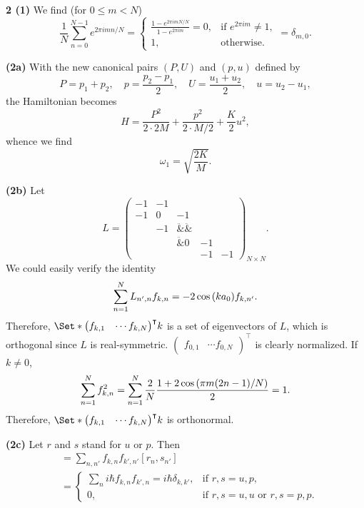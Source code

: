 \documentclass{article}
\makeatletter
\newcommand*{\shifttext}[1]{%
  \settowidth{\@tempdima}{#1}%
  \hspace{-\@tempdima}#1%
}
\newcommand{\plabel}[1]{%
\shifttext{\textbf{#1}\quad}%
}
\newcommand{\prule}{%
\begin{center}%
\hdashrule[0.5ex]{.99\linewidth}{1pt}{1pt 2.5pt}%
\end{center}%
}
\makeatother
\begin{document}
\prule
\plabel{2 (1)}%
We find (for $0\le m < N$)
\[ \frac{1}{N} \sum_{n=0}^{N-1} e^{2\pi i m n / N} = \begin{cases}
    \displaystyle\frac{1 - e^{2\pi i m N/N}}{1 - e^{2\pi i m}} = 0, & \text{if $e^{2\pi i m} \neq 1$}, \\
    1, &\text{otherwise}.
\end{cases} = \delta_{m,0}. \]

\plabel{(2a)}%
With the new canonical pairs $(P,U)$ and $(p,u)$ defined by
\[ P = p_1 + p_2,\quad p = \frac{p_2 - p_1}{2},\quad U = \frac{u_1 + u_2}{2}, \quad u = u_2 - u_1, \]
the Hamiltonian becomes
\[ H = \frac{P^2}{2\cdot 2M} + \frac{p^2}{2\cdot M/2} + \frac{K}{2} u^2, \]
whence we find
\[ \omega_1 = \sqrt{\frac{2K}{M}}. \]

\plabel{(2b)}%
Let
\begin{equation}
    \label{eq:n}
    L = \begin{pmatrix}
        -1 & -1 & & & \\
        -1 & 0 & -1 & & \\
        & -1 & \ddot & \ddot & \\
        & & \ddot & 0 & -1 \\
        & & & -1 & -1
    \end{pmatrix}_{N\times N}.
\end{equation}
We could easily verify the identity
\[ \sum_{n=1}^N L_{n',n} f_{k,n} = -2 \cos\qty(k a_0) f_{k,n'}. \]
Therefore, $\Set*{\begin{pmatrix}
    f_{k,1} & \cdots f_{k,N}
\end{pmatrix}^\intercal}{k}$
is a set of eigenvectors of $L$, which is orthogonal since $L$ is real-symmetric.
$\begin{pmatrix}
    f_{0,1} & \cdots f_{0,N}
\end{pmatrix}^\intercal$ is clearly normalized.
If $k\neq 0$,
\[ \sum_{n=1}^N f_{k,n}^2 = \sum_{n=1}^N \frac{2}{N}\frac{1 + 2\cos\qty(\pi m (2n-1) / N)}{2} = 1. \]
Therefore, $\Set*{\begin{pmatrix}
    f_{k,1} & \cdots f_{k,N}
\end{pmatrix}^\intercal}{k}$ is orthonormal.

\plabel{(2c)}%
Let $r$ and $s$ stand for $u$ or $p$. Then
\begin{align*}
    [\tilde{r}_k,\tilde{s}_{k'}] &= \sum_{n,n'} f_{k,n} f_{k',n'} [r_n,s_{n'}] \\
    &= \begin{cases}
        \displaystyle\sum_{n} i\hbar f_{k,n} f_{k',n} = i\hbar\delta_{k,k'}, & \text{if } r,s = u,p, \\
        0, & \text{if } r,s = u,u \text{ or } r,s=p,p.
    \end{cases}
\end{align*}
\end{document}

